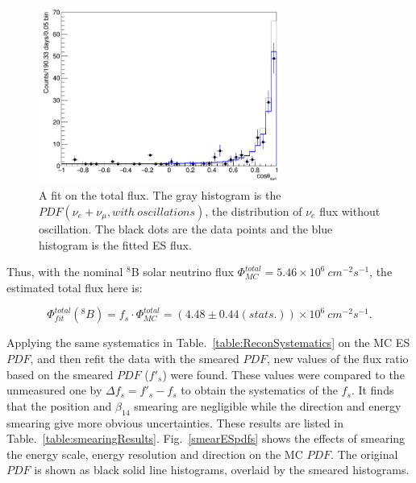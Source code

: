 \begin{figure}[!htb]
	\centering
	\includegraphics[width=8cm]{TOTALfluxFit.png}
	\caption{A fit on the total flux. The gray histogram is the $PDF(\nu_e+\nu_\mu,with~oscillations)$, the distribution of $\nu_e$ flux without oscillation. The black dots are the data points and the blue histogram is the fitted ES flux.}
	\label{fig:TOTALfluxFit}
\end{figure}

Thus, with the nominal $^8$B solar neutrino flux $\Phi^{total}_{MC}=5.46\times 10^6~cm^{-2}s^{-1}$, the estimated total flux here is:

\begin{equation}
\Phi^{total}_{fit}(^8 B)=f_s\cdot \Phi^{total}_{MC}=(4.48\pm 0.44(stats.))\times 10^6~cm^{-2}s^{-1}.
\end{equation}

Applying the same systematics in Table.~\ref{table:ReconSystematics} on the MC ES $PDF$, and then refit the data with the smeared $PDF$, new values of the flux ratio based on the smeared $PDF$ ($f'_s$) were found. These values were compared to the unmeasured one by $\Delta f_s =f'_s-f_s$ to obtain the systematics of the $f_s$. It finds that the position and $\beta_{14}$ smearing are negligible while the direction and energy smearing give more obvious uncertainties. These results are listed in Table.~\ref{table:smearingResults}. Fig.~\ref{smearESpdfs} shows the effects of smearing the energy scale, energy resolution and direction on the MC $PDF$. The original $PDF$ is shown as black solid line histograms, overlaid by the smeared histograms. 


